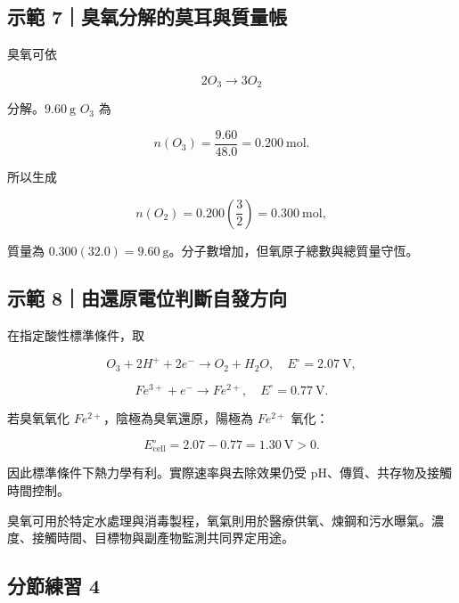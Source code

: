 \documentclass[11pt,a4paper]{article}
\begin{document}
\begin{HandoutWorkedExample}

\subsection{示範 7｜臭氧分解的莫耳與質量帳}\label{ux793aux7bc4-7ux81edux6c27ux5206ux89e3ux7684ux83abux8033ux8207ux8ceaux91cfux5e33}

臭氧可依

\[
2O_3\rightarrow3O_2
\]

分解。\(9.60\ \mathrm{g}\) \(O_3\) 為

\[
n(O_3)=\frac{9.60}{48.0}=0.200\ \mathrm{mol}.
\]

所以生成

\[
n(O_2)=0.200\left(\frac32\right)=0.300\ \mathrm{mol},
\]

質量為 \(0.300(32.0)=9.60\ \mathrm{g}\)。分子數增加，但氧原子總數與總質量守恆。

\end{HandoutWorkedExample}

\begin{HandoutWorkedExample}

\subsection{示範 8｜由還原電位判斷自發方向}\label{ux793aux7bc4-8ux7531ux9084ux539fux96fbux4f4dux5224ux65b7ux81eaux767cux65b9ux5411}

在指定酸性標準條件，取

\[
O_3+2H^++2e^-\rightarrow O_2+H_2O,\quad E^\circ=2.07\ \mathrm{V},
\]

\[
Fe^{3+}+e^-\rightarrow Fe^{2+},\quad E^\circ=0.77\ \mathrm{V}.
\]

若臭氧氧化 \(Fe^{2+}\)，陰極為臭氧還原，陽極為 \(Fe^{2+}\) 氧化：

\[
E^\circ_{\mathrm{cell}}=2.07-0.77=1.30\ \mathrm{V}>0.
\]

因此標準條件下熱力學有利。實際速率與去除效果仍受 pH、傳質、共存物及接觸時間控制。

\end{HandoutWorkedExample}

臭氧可用於特定水處理與消毒製程，氧氣則用於醫療供氧、煉鋼和污水曝氣。濃度、接觸時間、目標物與副產物監測共同界定用途。

\subsection{分節練習 4}\label{ux5206ux7bc0ux7df4ux7fd2-4}
\end{document}
